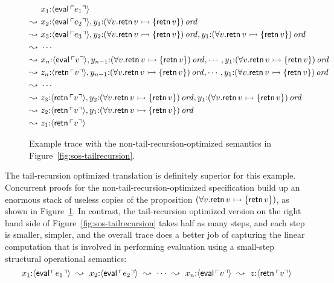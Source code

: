 \begin{figure}
\begin{align*}
& x_1{:}\langle {{\sf eval}\,{\ulcorner{e_1}\urcorner}} \rangle 
\\
\leadsto ~ & x_2{:}\langle {{\sf eval}\,{\ulcorner{e_2}\urcorner}} \rangle, 
  y_1{:}{(\forall v. {\sf retn}\,v \rightarrowtail \{ {\sf retn}\,v \})}\,{{\it ord}} 
\\
\leadsto ~ & x_3{:}\langle {{\sf eval}\,{\ulcorner{e_3}\urcorner}} \rangle, 
  y_2{:}{(\forall v. {\sf retn}\,v \rightarrowtail \{ {\sf retn}\,v \})}\,{{\it ord}}, 
  y_1{:}{(\forall v. {\sf retn}\,v \rightarrowtail \{ {\sf retn}\,v \})}\,{{\it ord}} 
\\
\leadsto ~ & \cdots
\\
\leadsto ~ & x_n{:}\langle {{\sf eval}\,{\ulcorner{v}\urcorner}} \rangle, 
  y_{n-1}{:}{(\forall v. {\sf retn}\,v \rightarrowtail \{ {\sf retn}\,v \})}\,{{\it ord}}, 
  \cdots,
  y_1{:}{(\forall v. {\sf retn}\,v \rightarrowtail \{ {\sf retn}\,v \})}\,{{\it ord}} 
\\
\leadsto ~ & z_n{:}\langle {{\sf retn}\,{\ulcorner{v}\urcorner}} \rangle, 
  y_{n-1}{:}{(\forall v. {\sf retn}\,v \rightarrowtail \{ {\sf retn}\,v \})}\,{{\it ord}}, 
  \cdots,
  y_1{:}{(\forall v. {\sf retn}\,v \rightarrowtail \{ {\sf retn}\,v \})}\,{{\it ord}} 
\\
\leadsto ~ & \cdots 
\\
\leadsto ~ & z_3{:}\langle {{\sf retn}\,{\ulcorner{v}\urcorner}} \rangle, 
  y_2{:}{(\forall v. {\sf retn}\,v \rightarrowtail \{ {\sf retn}\,v \})}\,{{\it ord}}, 
  y_1{:}{(\forall v. {\sf retn}\,v \rightarrowtail \{ {\sf retn}\,v \})}\,{{\it ord}} 
\\
\leadsto ~ & z_2{:}\langle {{\sf retn}\,{\ulcorner{v}\urcorner}} \rangle, 
  y_1{:}{(\forall v. {\sf retn}\,v \rightarrowtail \{ {\sf retn}\,v \})}\,{{\it ord}} \\
\leadsto ~ & z_1{:}\langle {{\sf retn}\,{\ulcorner{v}\urcorner}} \rangle
\end{align*}
\caption{Example trace with the non-tail-recursion-optimized
  semantics in Figure~\ref{fig:sos-tailrecursion}.}
\label{fig:example-proc-non-tail-recursive-trace}
\end{figure}

The tail-recursion optimized translation is definitely superior for
this example. Concurrent proofs for the non-tail-recursion-optimized
specification build up an enormous stack of useless copies of the
proposition $(\forall v. {\sf retn}\,v \rightarrowtail \{ {\sf retn}\,v \})$,
as shown in Figure~\ref{fig:example-proc-non-tail-recursive-trace}.
In contrast, the tail-recursion optimized version on the right hand
side of Figure~\ref{fig:sos-tailrecursion} takes half as many steps,
and each step is smaller, simpler, and the overall trace does a better
job of capturing the linear computation that is involved in performing
evaluation using a small-step structural operational semantics:
\[
x_1{:}\langle {{\sf eval}\,{\ulcorner{e_1}\urcorner}} \rangle
 ~\leadsto~
x_2{:}\langle {{\sf eval}\,{\ulcorner{e_2}\urcorner}} \rangle
 ~\leadsto~ \cdots ~\leadsto~
x_n{:}\langle {{\sf eval}\,{\ulcorner{v}\urcorner}} \rangle
 ~\leadsto~ 
z{:}\langle {{\sf retn}\,{\ulcorner{v}\urcorner}} \rangle
\]

